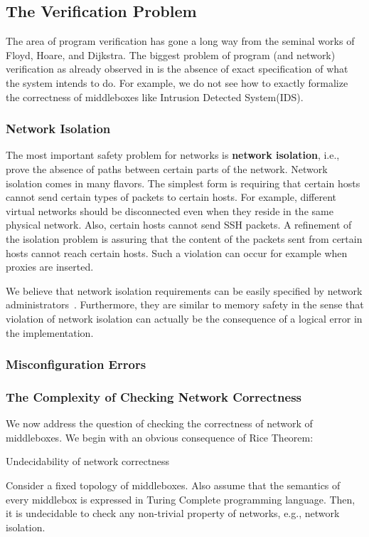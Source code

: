 \subsection{The Verification Problem}
\label{sec:Verification}
The area of program verification has gone a long way from the seminal works of Floyd, Hoare, and Dijkstra.
The biggest problem of program (and network) verification as already observed in \cite{popl:DeMilloLP77} is the absence of exact specification of what the system intends to do.
For example, we do not see how to exactly formalize the correctness of middleboxes like Intrusion Detected System(IDS).

\subsubsection{Network Isolation}
The most important safety problem for networks is \textbf{network isolation}, i.e., prove the absence of
paths between certain parts of the network.
Network isolation comes in many flavors.
The simplest form is requiring that certain hosts cannot send certain types of packets to certain hosts.
For example, different virtual networks should be disconnected even when they reside in the same physical network.
Also, certain hosts cannot send SSH packets.
A refinement of the isolation problem is assuring that the content of the packets sent from certain hosts cannot reach
certain hosts.
Such a violation can occur for example when proxies are inserted.

We believe that network isolation requirements can be easily specified by network administrators~\cite{Congress}.
Furthermore, they are similar to memory safety in the sense that violation of network isolation can actually be the consequence
of a logical error in the implementation.

\subsubsection{Misconfiguration Errors}


\subsubsection{The Complexity of Checking Network Correctness}
We now address the question of checking the correctness of network of middleboxes.
We begin with an obvious consequence of Rice Theorem:
\begin{theorem}
\begin{Name}Undecidability of network correctness\end{Name}
Consider a fixed topology of middleboxes.
Also assume that the semantics of every middlebox is expressed in Turing Complete programming language.
Then, it is undecidable to check any non-trivial property of networks, e.g., network isolation.
\end{theorem}

